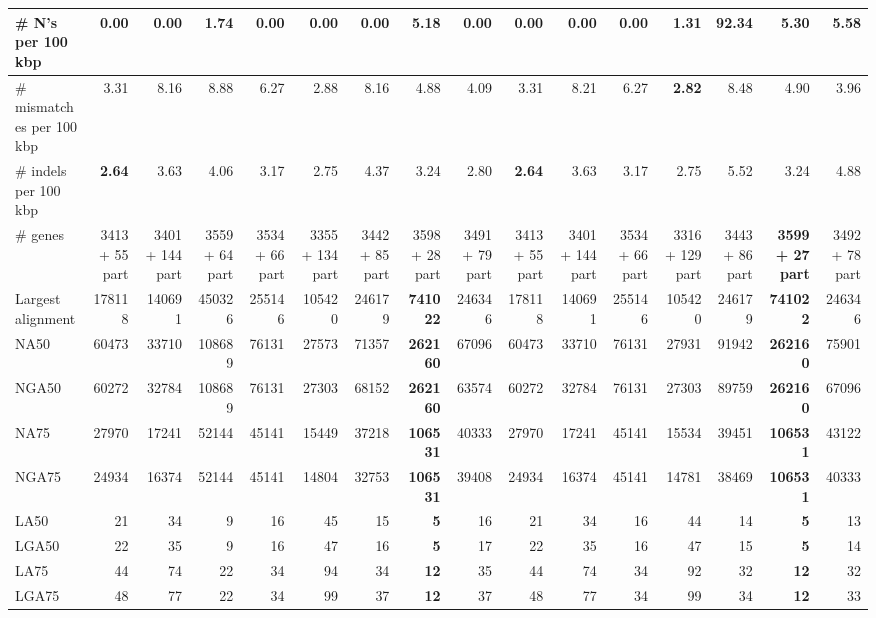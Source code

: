 \documentclass[12pt,a4paper]{article}
\begin{document}
\begin{table}[ht]
\begin{center}
\begin{tabular}{|l*{15}{|r}|}
\# N's per 100 kbp & {\bf 0.00} & {\bf 0.00} & 1.74 & {\bf 0.00} & {\bf 0.00} & {\bf 0.00} & 5.18 & {\bf 0.00} & {\bf 0.00} & {\bf 0.00} & {\bf 0.00} & 1.31 & 92.34 & 5.30 & 5.58 \\ \hline
\# mismatches per 100 kbp & 3.31 & 8.16 & 8.88 & 6.27 & 2.88 & 8.16 & 4.88 & 4.09 & 3.31 & 8.21 & 6.27 & {\bf 2.82} & 8.48 & 4.90 & 3.96 \\ \hline
\# indels per 100 kbp & {\bf 2.64} & 3.63 & 4.06 & 3.17 & 2.75 & 4.37 & 3.24 & 2.80 & {\bf 2.64} & 3.63 & 3.17 & 2.75 & 5.52 & 3.24 & 4.88 \\ \hline
\# genes & 3413 + 55 part & 3401 + 144 part & 3559 + 64 part & 3534 + 66 part & 3355 + 134 part & 3442 + 85 part & 3598 + 28 part & 3491 + 79 part & 3413 + 55 part & 3401 + 144 part & 3534 + 66 part & 3316 + 129 part & 3443 + 86 part & {\bf 3599 + 27 part} & 3492 + 78 part \\ \hline
Largest alignment & 178118 & 140691 & 450326 & 255146 & 105420 & 246179 & {\bf 741022} & 246346 & 178118 & 140691 & 255146 & 105420 & 246179 & {\bf 741022} & 246346 \\ \hline
NA50 & 60473 & 33710 & 108689 & 76131 & 27573 & 71357 & {\bf 262160} & 67096 & 60473 & 33710 & 76131 & 27931 & 91942 & {\bf 262160} & 75901 \\ \hline
NGA50 & 60272 & 32784 & 108689 & 76131 & 27303 & 68152 & {\bf 262160} & 63574 & 60272 & 32784 & 76131 & 27303 & 89759 & {\bf 262160} & 67096 \\ \hline
NA75 & 27970 & 17241 & 52144 & 45141 & 15449 & 37218 & {\bf 106531} & 40333 & 27970 & 17241 & 45141 & 15534 & 39451 & {\bf 106531} & 43122 \\ \hline
NGA75 & 24934 & 16374 & 52144 & 45141 & 14804 & 32753 & {\bf 106531} & 39408 & 24934 & 16374 & 45141 & 14781 & 38469 & {\bf 106531} & 40333 \\ \hline
LA50 & 21 & 34 & 9 & 16 & 45 & 15 & {\bf 5} & 16 & 21 & 34 & 16 & 44 & 14 & {\bf 5} & 13 \\ \hline
LGA50 & 22 & 35 & 9 & 16 & 47 & 16 & {\bf 5} & 17 & 22 & 35 & 16 & 47 & 15 & {\bf 5} & 14 \\ \hline
LA75 & 44 & 74 & 22 & 34 & 94 & 34 & {\bf 12} & 35 & 44 & 74 & 34 & 92 & 32 & {\bf 12} & 32 \\ \hline
LGA75 & 48 & 77 & 22 & 34 & 99 & 37 & {\bf 12} & 37 & 48 & 77 & 34 & 99 & 34 & {\bf 12} & 33 \\ \hline
\end{tabular}
\end{center}
\end{table}
\end{document}
